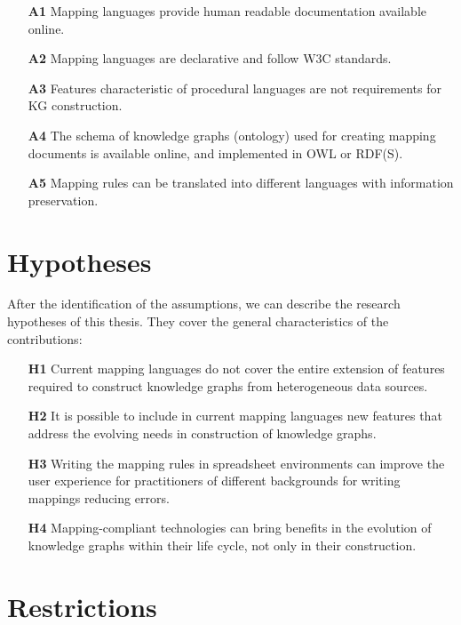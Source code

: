 \begin{enumerate}
    \item[\textbf{A1}] Mapping languages provide human readable documentation available online.
    \item[\textbf{A2}] Mapping languages are declarative and follow W3C standards.
    \item[\textbf{A3}] Features characteristic of procedural languages are not requirements for KG construction.
    \item[\textbf{A4}] The schema of knowledge graphs (ontology) used for creating mapping documents is available online, and implemented in OWL or RDF(S). 
    \item[\textbf{A5}] Mapping rules can be translated into different languages with information preservation.
\end{enumerate}


\section{Hypotheses}
\label{sec:chp3-hypotheses}

After the identification of the assumptions, we can describe the research hypotheses  of this thesis. They cover the general characteristics of the contributions:

\begin{enumerate}
    \item[\textbf{H1}] Current mapping languages do not cover the entire extension of features required to construct knowledge graphs from heterogeneous data sources.
    \item[\textbf{H2}] It is possible to include in current mapping languages new features that address the evolving needs in construction of knowledge graphs.
    \item[\textbf{H3}] Writing the mapping rules in spreadsheet environments can improve the user experience for practitioners of different backgrounds for writing mappings reducing errors. 
    \item[\textbf{H4}] Mapping-compliant technologies can bring benefits in the evolution of knowledge graphs within their life cycle, not only in their construction.
\end{enumerate}


\section{Restrictions}
\label{sec:chp3-restrictions}

